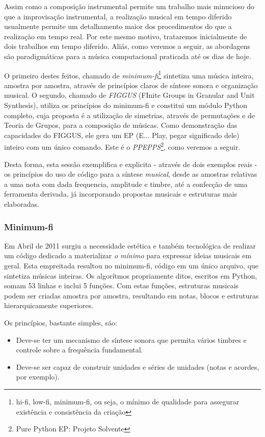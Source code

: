 Assim como a composição instrumental permite um trabalho mais minucioso do que
a improvisação instrumental, a realização musical em tempo diferido usualmente permite um
detalhamento maior dos procedimentos do que a realização em tempo real. Por este
mesmo motivo, trataremos inicialmente de dois trabalhos em tempo diferido.
Aliás, como veremos a seguir, as abordagens são paradigmáticas para a música
computacional praticada até os dias de hoje.

O primeiro destes feitos, chamado de \emph{minimum-fi}\footnote{hi-fi, low-fi, minimum-fi, ou seja,
o mínimo de qualidade para assegurar existência e consistência
da criação} sintetiza uma música inteira, amostra por amostra, através de princípios
claros de síntese sonora e organização musical. O segundo, chamado de \emph{FIGGUS} (FInite
Groups in Granular and Unit Synthesis), utiliza os princípios do minimum-fi e constitui
um módulo Python completo, cuja proposta é a utilização de simetrias, através de
permutações e de Teoria de Grupos, para a composição de músicas. Como demonstração
das capacidades do FIGGUS, ele gera um EP (E... Play, pegar significado dele) inteiro com um único comando. Este é o
\emph{PPEPPS}\footnote{Pure Python EP: Projeto Solvente}, como veremos a seguir.

Desta forma, esta sessão exemplifica e explicita - através de dois exemplos reais - os
princípios do uso de código para a síntese \emph{musical}, desde as amostras
relativas a uma nota com dada frequencia, amplitude e timbre, até a confecção
de uma ferramenta derivada, já incorporando propostas musicais e estruturas
mais elaboradas.

      \subsubsection{Minimum-fi}

Em Abril de 2011 surgiu a necessidade estética e também tecnológica
de realizar um código dedicado a materializar \emph{o mínimo}
para expressar ideias musicais em geral. Esta empreitada
resultou no minimum-fi, código em um único arquivo, que sintetiza
músicas inteiras. Os algorítmos propriamente ditos, escritos em Python, somam 
53 linhas e inclui 5 funções. Com estas funções, estruturas musicais podem 
ser criadas amostra por amostra, resultando em notas, blocos e estruturas hierarquicamente superiores.

Os princípios, bastante simples, são:
\begin{itemize}
  \item Deve-se ter um mecanismo de síntese sonora que
permita vários timbres e controle sobre a frequência fundamental.
  \item Deve-se ser capaz de construir unidades e séries de unidades (notas e acordes, por exemplo).
\end{itemize}


